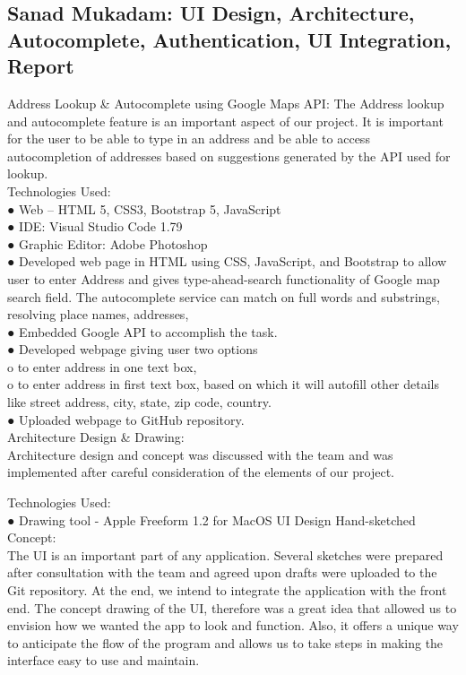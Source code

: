 \documentclass{article}
\begin{document}
\subsection{Sanad Mukadam: UI Design, Architecture, Autocomplete, Authentication, UI Integration, Report}
Address Lookup & Autocomplete using Google Maps API: 
The Address lookup and autocomplete feature is an important aspect of our project. It is important for the user to be able to type in an address and be able to access autocompletion of addresses based on suggestions generated by the API used for lookup. \\
Technologies Used:  \\
●	Web – HTML 5, CSS3, Bootstrap 5, JavaScript \\
●	IDE: Visual Studio Code 1.79 \\
●	Graphic Editor: Adobe Photoshop \\
 
●	Developed web page in HTML using CSS, JavaScript, and Bootstrap to allow user to enter Address and gives type-ahead-search functionality of Google map search field. The autocomplete service can match on full words and substrings, resolving place names, addresses,  \\
●	Embedded Google API to accomplish the task. \\
●	Developed webpage giving user two options  \\
o	to enter address in one text box, \\
o	to enter address in first text box, based on which it will autofill other details like street address, city, state, zip code, country.  \\
●	Uploaded webpage to GitHub repository. \\
 
Architecture Design & Drawing: \\
Architecture design and concept was discussed with the team and was implemented after careful consideration of the elements of our project. 
 
Technologies Used:  \\
●	Drawing tool - Apple Freeform 1.2 for MacOS
UI Design Hand-sketched Concept: \\
The UI is an important part of any application. Several sketches were prepared after consultation with the team and agreed upon drafts were uploaded to the Git repository. At the end, we intend to integrate the application with the front end. The concept drawing of the UI, therefore was a great idea that allowed us to envision how we wanted the app to look and function. Also, it offers a unique way to anticipate the flow of the program and allows us to take steps in making the interface easy to use and maintain.
\end{document}
